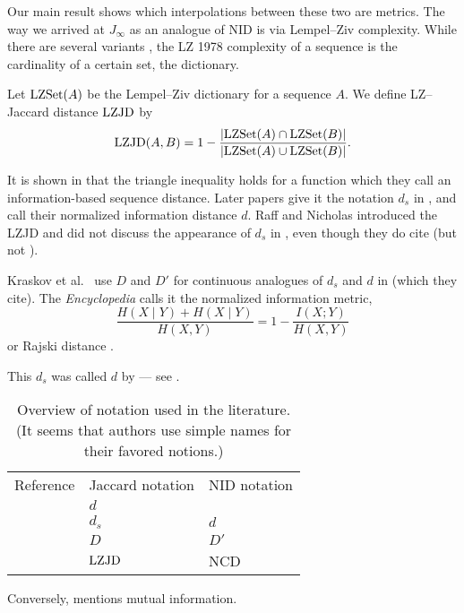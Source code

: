		Our main result  shows which interpolations between these two are metrics.
		The way we arrived at $J_{\infty}$ as an analogue of NID is via Lempel--Ziv complexity.
		While there are several variants \cite{MR389403,MR530215,MR507465}, the LZ 1978 complexity \cite{MR507465} of a sequence is the cardinality of a certain set, the dictionary.
		\begin{definition}
			Let $\operatorname{LZSet}(A)$ be the Lempel--Ziv dictionary for a sequence $A$.
			We define
			LZ--Jaccard distance $\operatorname{LZJD}$ by
			\[
				\operatorname{LZJD}(A,B) = 1- \frac{\lvert\operatorname{LZSet}(A)\cap \operatorname{LZSet}(B)\rvert}{\lvert\operatorname{LZSet}(A)\cup \operatorname{LZSet}(B)\rvert}.
			\]
		\end{definition}
		It is shown in \cite[Theorem 1]{Li2001AnIS} that the triangle inequality holds for a function which they call an information-based sequence distance.
		Later papers give it the notation $d_s$ in \cite[Definition V.1]{MR2103495}, and call their normalized information distance $d$.
		Raff and Nicholas \cite{Raff2017AnAT} introduced the LZJD and did not discuss the appearance of $d_s$ in \cite[Definition V.1]{MR2103495},
		even though they do cite \cite{MR2103495} (but not \cite{Li2001AnIS}).


		Kraskov et al.~\cite{Kraskov2003HierarchicalCB,Kraskov_2005} use $D$ and $D'$ for continuous analogues of $d_s$ and $d$ in \cite{MR2103495} (which they cite).
		The \emph{Encyclopedia} calls it the normalized information metric,
		\[
			\frac{H(X\mid Y)+H(X\mid Y)}{H(X,Y)} = 1 - \frac{I(X;Y)}{H(X,Y)}
		\]
		or Rajski distance \cite{MR0134805}.

		This $d_s$ was called $d$ by \cite{Li2001AnIS} --- see .
		\begin{table}
			\begin{tabular}{l l l}
				Reference					&	Jaccard notation 	& NID notation\\
				\cite{Li2001AnIS}			&	$d$		&\\
				\cite{MR2103495}			&	$d_s$	& $d$\\
				\cite{Kraskov_2005}			&	$D$		& $D'$\\
				\cite{Raff2017AnAT}			&	$\operatorname{LZJD}$	& NCD
			\end{tabular}
			\caption{Overview of notation used in the literature. (It seems that authors use simple names for their favored notions.)}\label{favored}
		\end{table}
		Conversely, \cite[near Definition V.1]{MR2103495} mentions mutual information.

